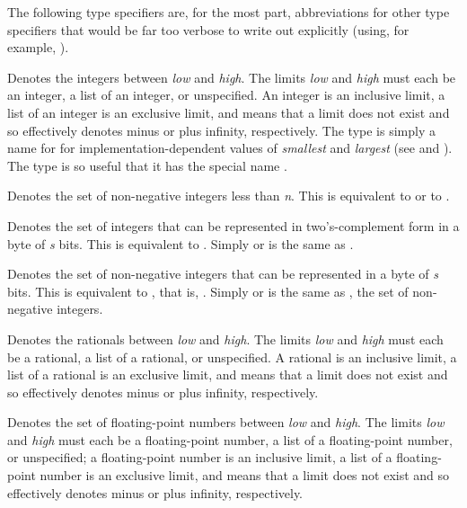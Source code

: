 The following type specifiers are, for the most part,
abbreviations for other type specifiers that would be far too
verbose to write out explicitly (using, for example, ).

\begin{flushdesc}
\item[\cd{(integer \emph{low} \emph{high})}]
Denotes the integers between
\emph{low} and \emph{high}.  The limits \emph{low} and \emph{high}
must each be an integer, a list of an integer, or unspecified.
An integer is an inclusive limit,
a list of an integer is an exclusive limit, and
\cd{*} means that a limit does not exist
and so effectively denotes minus or plus infinity, respectively.
The type  is simply a name
for  for implementation-dependent
values of \emph{smallest} and \emph{largest}
(see  and ).
The type 
is so useful that it has the special name .

\item[\cd{(mod \emph{n})}]
Denotes the set of non-negative integers less than \emph{n}.
This is equivalent to 
or to .

\item[\cd{(signed-byte \emph{s})}]
Denotes the set of integers that can be represented
in two's-complement form in a byte of \emph{s} bits.  This is
equivalent to
.
Simply  or  is the same as .

\item[\cd{(unsigned-byte \emph{s})}]
Denotes the set of non-negative integers that can be
represented in a byte of \emph{s} bits.  This is equivalent to , that is, .
Simply  or  is the same as
, the set of non-negative integers.

\item[\cd{(rational \emph{low} \emph{high})}]
Denotes the rationals between
\emph{low} and \emph{high}.  The limits \emph{low} and \emph{high}
must each be a rational, a list of a rational, or unspecified.
A rational is an inclusive limit,
a list of a rational is an exclusive limit, and
\cd{*} means that a limit does not exist
and so effectively denotes minus or plus infinity, respectively.

\item[\cd{(float \emph{low} \emph{high})}]
Denotes the set of floating-point numbers between
\emph{low} and \emph{high}.  The limits \emph{low} and \emph{high}
must each be a floating-point number, a list of a floating-point number,
or unspecified; a floating-point number is an inclusive limit, a list of a
floating-point number is an exclusive limit, and
\cd{*} means that a limit does not exist
and so effectively denotes minus or plus infinity, respectively.


\end{flushdesc}
